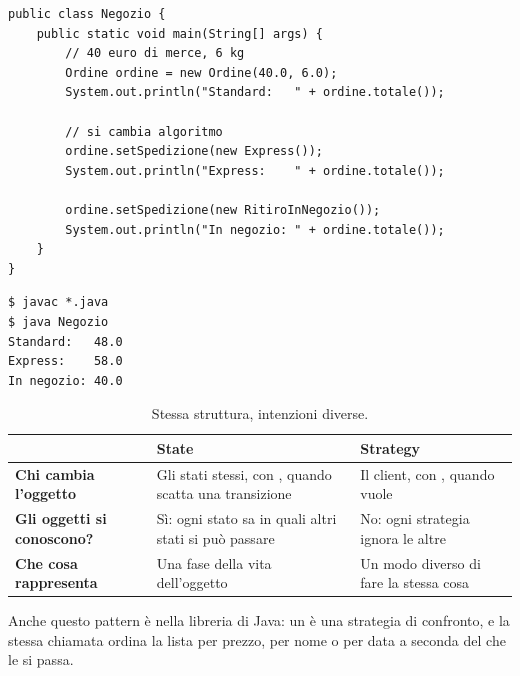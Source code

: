 \noindent\begin{minipage}[t]{0.62\textwidth}
\begin{lstlisting}[style=java, name=Negozio.java]
public class Negozio {
    public static void main(String[] args) {
        // 40 euro di merce, 6 kg
        Ordine ordine = new Ordine(40.0, 6.0);
        System.out.println("Standard:   " + ordine.totale());

        // si cambia algoritmo
        ordine.setSpedizione(new Express());
        System.out.println("Express:    " + ordine.totale());

        ordine.setSpedizione(new RitiroInNegozio());
        System.out.println("In negozio: " + ordine.totale());
    }
}
\end{lstlisting}
\end{minipage}\hfill
\begin{minipage}[t]{0.35\textwidth}
\begin{lstlisting}[style=shell, name=Terminale]
$ javac *.java
$ java Negozio
Standard:   48.0
Express:    58.0
In negozio: 40.0
\end{lstlisting}
\end{minipage}

\begin{table}[H]
\centering
\renewcommand{\arraystretch}{1.3}
\begin{tabularx}{\textwidth}{>{\bfseries}P{3.4cm} L L}
\toprule
 & \textbf{State} & \textbf{Strategy} \\
\midrule
Chi cambia l'oggetto & Gli stati stessi, con , quando scatta una transizione & Il client, con
  , quando vuole \\
Gli oggetti si conoscono? & Sì: ogni stato sa in quali altri stati si può passare & No: ogni strategia ignora le altre \\
Che cosa rappresenta & Una fase della vita dell'oggetto & Un modo diverso di fare la stessa cosa \\
\bottomrule
\end{tabularx}
\caption{Stessa struttura, intenzioni diverse.}
\end{table}

Anche questo pattern è nella libreria di Java: un  è una strategia di confronto, e la stessa chiamata
 ordina la lista per prezzo, per nome o per data a seconda del  che le si passa.

